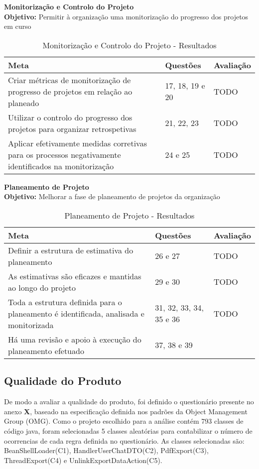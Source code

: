 \documentclass[openany,10pt,a4paper]{article}
\begin{document}
\textbf{Monitorização e Controlo do Projeto}  \\
\textbf{Objetivo:} Permitir à organização uma monitorização do progresso dos projetos em curso
    
\begin{table}[h]
    \centering
    \caption{Monitorização e Controlo do Projeto - Resultados}
    \begin{tabular}{p{2in}|p{2in}|p{2in}}
         \hline	
		\textbf{Meta} & \textbf{Questões} & \textbf{Avaliação} \\ \hline
		Criar métricas de monitorização de progresso de projetos em relação ao planeado & 17, 18, 19 e 20 & TODO \\ \hline
		Utilizar o controlo do progresso dos projetos para organizar retrospetivas & 21, 22, 23 & TODO \\ \hline
		Aplicar efetivamente medidas corretivas para os processos negativamente identificados na monitorização & 24 e 25 & TODO \\ \hline
    \end{tabular}
    \label{tab:analise-monitorizacao}
\end{table}

\textbf{Planeamento de Projeto}  \\
\textbf{Objetivo:} Melhorar a fase de planeamento de projetos da organização

\begin{table}[]
    \centering
    \caption{Planeamento de Projeto - Resultados}
    \begin{tabular}{p{3in}|p{2in}|p{1in}}
        \hline	
		\textbf{Meta} & \textbf{Questões} & \textbf{Avaliação} \\ \hline
		Definir a estrutura de estimativa do planeamento & 26 e 27 & TODO \\ \hline
		As estimativas são eficazes e mantidas ao longo do projeto & 29 e 30 & TODO \\ \hline
		Toda a estrutura definida para o planeamento é identificada, analisada e monitorizada & 31, 32, 33, 34, 35 e 36 & TODO \\ \hline
		Há uma revisão e apoio à execução do planeamento efetuado & 37, 38 e 39
	\end{tabular}
    \label{tab:analise-planeamento}
\end{table}



\subsection{Qualidade do Produto}
De modo a avaliar a qualidade do produto, foi definido o questionário presente no anexo \textbf{X}, baseado na especificação definida nos padrões da Object Management Group (OMG). Como o projeto escolhido para a análise contém 793 classes de código java, foram selecionadas 5 classes aleatórias para contabilizar o número de ocorrencias de cada regra definida no questionário. As classes selecionadas são: BeanShellLoader(C1), HandlerUserChatDTO(C2), PdfExport(C3), ThreadExport(C4) e UnlinkExportDataAction(C5).
\end{document}

